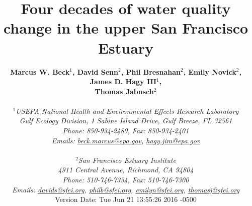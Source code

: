 \documentclass[letterpaper,12pt,oneside]{article}\usepackage[]{graphicx}\usepackage[]{color}
\begin{document}
\raggedbottom
\linenumbers
\raggedright
{}
\setlength{\parindent}{0.5in}
\renewcommand\refname{References \vspace{12pt}}

\begin{singlespace}
\title{{\bf {\Large Four decades of water quality change in the upper San Francisco Estuary}}}
\author{
  {\bf {\normalsize Marcus W. Beck$^1$, David Senn$^2$, Phil Bresnahan$^2$, Emily Novick$^2$, James D. Hagy III$^1$,}}
  \\{\bf {\normalsize Thomas Jabusch$^2$}}
  \\\\{\textit {\normalsize $^1$USEPA National Health and Environmental Effects Research Laboratory}}
  \\{\textit {\normalsize Gulf Ecology Division, 1 Sabine Island Drive, Gulf Breeze, FL 32561}}
	\\{\textit {\normalsize Phone: 850-934-2480, Fax: 850-934-2401}}
	\\{\textit {\normalsize Emails: \href{mailto:beck.marcus@epa.gov}{beck.marcus@epa.gov}, \href{mailto:hagy.jim@epa.gov}{hagy.jim@epa.gov}}}
  \\\\{\textit {\normalsize $^2$San Francisco Estuary Institute}}
	\\{\textit {\normalsize 4911 Central Avenue, Richmond, CA 94804}}
	\\{\textit {\normalsize Phone: 510-746-7334, Fax: 510-746-7300}}
	\\{\textit {\normalsize Emails: \href{mailto:davids@sfei.org}{davids@sfei.org}, \href{mailto:philb@sfei.org}{philb@sfei.org}, \href{mailto:emilyn@sfei.org}{emilyn@sfei.org}, \href{mailto:thomasj@sfei.org}{thomasj@sfei.org}}}
  \vspace{1in} 
  \\ Version Date:   Tue Jun 21 13:55:26 2016 -0500
	}
\date{}
\maketitle
\end{singlespace}
\clearpage
\end{document}
